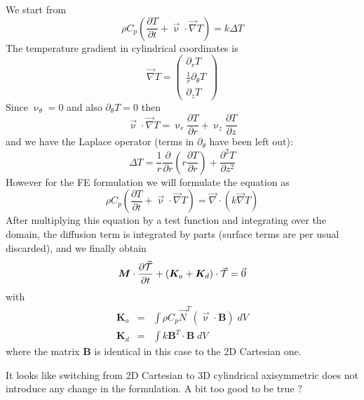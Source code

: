 We start from
\[
\rho C_p \left(\frac{\partial T}{\partial t} 
+\vec\upnu\cdot\vec\nabla T \right)
= k \Delta T
\]
The temperature gradient in cylindrical coordinates is 
\[
\vec\nabla T = 
\left(
\begin{array}{c}
\partial_r T \\
\frac{1}{r}\partial_\theta T \\
\partial_z T 
\end{array}
\right)
\]
Since $\upnu_\theta=0$ and also $\partial_\theta T=0$ then 
\[
\vec\upnu\cdot\vec\nabla T = \upnu_r \frac{\partial T}{\partial r}
+ \upnu_z \frac{\partial T}{\partial z}
\]
and we have the Laplace operator (terms in $\partial_\theta$ have 
been left out):
\[
\Delta T = \frac{1}{r} \frac{\partial }{\partial r}
\left(r \frac{\partial T}{\partial r} \right)
+\frac{\partial^2 T }{\partial z^2}
\]
However for the FE formulation we will formulate the equation as
\[
\rho C_p \left(\frac{\partial T}{\partial t} 
+\vec\upnu\cdot\vec\nabla T \right)
= \vec\nabla \cdot (k \vec\nabla T)
\]
After multiplying this equation by a test function and integrating over the domain, the diffusion term is integrated by parts (surface terms are per usual discarded), and we finally obtain
\[
{\bm M} \cdot \frac{\partial \vec{\cal T}}{\partial t}
+
({\bm K}_a + {\bm K}_d ) \cdot \vec{\cal T} = \vec{0}
\]
with
\begin{eqnarray}
{\bm K}_a &=& \int \rho C_p \vec    {N}^T (\vec\upnu\cdot {\bm B}) \; dV \\
{\bm K}_d &=& \int k {\bm B}^T \cdot {\bm B} \; dV 
\end{eqnarray}
where the matrix ${\bm B}$ is identical in this case to the 2D Cartesian one.

It looks like switching from 2D Cartesian to 3D cylindrical axisymmetric does not introduce any change in the formulation.
A bit too good to be true ? 
